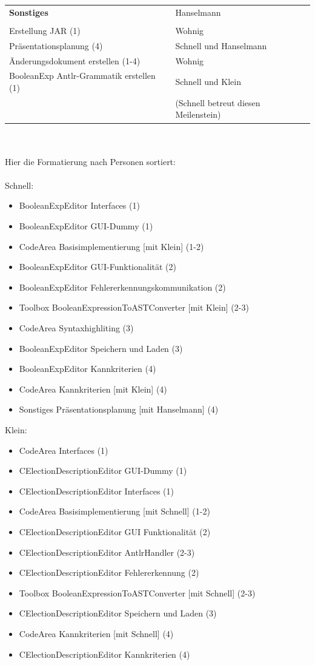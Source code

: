 \documentclass[a4paper]{scrreprt}
\begin{document}
\begin{tabular}{ | p{7cm} | p{7cm} |}
	\rule{0pt}{15pt}\textbf {Sonstiges} & Hanselmann\\
	&\\
	\hline
	Erstellung JAR (1) & Wohnig \\
	\hline
	Präsentationsplanung (4) & Schnell und Hanselmann  \\
	\hline
	Änderungsdokument erstellen (1-4) & Wohnig \\
	\hline
	BooleanExp Antlr-Grammatik erstellen (1) & Schnell und Klein \\
	& (Schnell betreut diesen Meilenstein) \\
	\hline
	
    \end{tabular}\\\\

Hier die Formatierung nach Personen sortiert: \\\\
Schnell:
\begin{itemize} 
\item BooleanExpEditor Interfaces (1)
\item BooleanExpEditor GUI-Dummy (1)
\item CodeArea Basisimplementierung [mit Klein] (1-2)
\item BooleanExpEditor GUI-Funktionalität (2)
\item BooleanExpEditor Fehlererkennungskommunikation (2) 
\item Toolbox BooleanExpressionToASTConverter [mit Klein] (2-3) 
\item CodeArea Syntaxhighliting (3)
\item BooleanExpEditor Speichern und Laden (3) 
\item BooleanExpEditor Kannkriterien (4)
\item CodeArea Kannkriterien [mit Klein] (4)
\item Sonstiges Präsentationsplanung [mit Hanselmann] (4)
\end{itemize} 
\vspace{8mm}
Klein: 
\begin{itemize}
\item CodeArea Interfaces (1)
\item CElectionDescriptionEditor GUI-Dummy (1) 
\item CElectionDescriptionEditor Interfaces (1)
\item CodeArea Basisimplementierung [mit Schnell] (1-2)
\item CElectionDescriptionEditor GUI Funktionalität (2)
\item CElectionDescriptionEditor AntlrHandler (2-3)
\item CElectionDescriptionEditor Fehlererkennung (2) 
\item Toolbox BooleanExpressionToASTConverter [mit Schnell] (2-3) 
\item CElectionDescriptionEditor Speichern und Laden (3)
\item CodeArea Kannkriterien [mit Schnell] (4)
\item CElectionDescriptionEditor Kannkriterien (4)
\end{itemize} 
\end{document}
